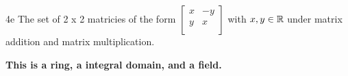 \begin{question}{4e}
The set of 2 x 2 matricies of the form $\begin{bmatrix}
  x & -y \\
  y & x  \\
 \end{bmatrix}$ with $x,y \in \mathbb{R}$ under matrix addition and matrix multiplication. 
\end{question}

\textbf{This is a ring, a integral domain, and a field.}

